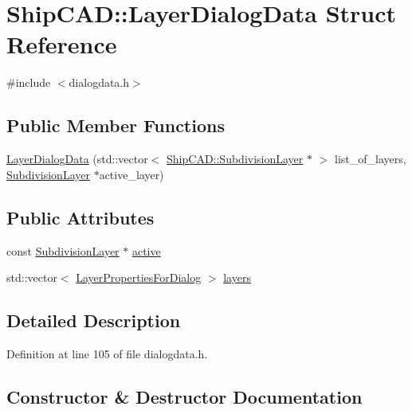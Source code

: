 \hypertarget{structShipCAD_1_1LayerDialogData}{}\section{Ship\+C\+AD\+:\+:Layer\+Dialog\+Data Struct Reference}
\label{structShipCAD_1_1LayerDialogData}


{\ttfamily \#include $<$dialogdata.\+h$>$}

\subsection*{Public Member Functions}
\begin{DoxyCompactItemize}
\item 
\hyperlink{structShipCAD_1_1LayerDialogData_a103bbd6fea98f88c5e2d150b950eb4dc}{Layer\+Dialog\+Data} (std\+::vector$<$ \hyperlink{classShipCAD_1_1SubdivisionLayer}{Ship\+C\+A\+D\+::\+Subdivision\+Layer} $\ast$ $>$ list\+\_\+of\+\_\+layers, \hyperlink{classShipCAD_1_1SubdivisionLayer}{Subdivision\+Layer} $\ast$active\+\_\+layer)
\end{DoxyCompactItemize}
\subsection*{Public Attributes}
\begin{DoxyCompactItemize}
\item 
const \hyperlink{classShipCAD_1_1SubdivisionLayer}{Subdivision\+Layer} $\ast$ \hyperlink{structShipCAD_1_1LayerDialogData_a1afb0b48ae0398225fc6b8f3207fb6fb}{active}
\item 
std\+::vector$<$ \hyperlink{structShipCAD_1_1LayerPropertiesForDialog}{Layer\+Properties\+For\+Dialog} $>$ \hyperlink{structShipCAD_1_1LayerDialogData_a9ba6f5373c88460d880811ad835d74f1}{layers}
\end{DoxyCompactItemize}


\subsection{Detailed Description}


Definition at line 105 of file dialogdata.\+h.



\subsection{Constructor \& Destructor Documentation}
